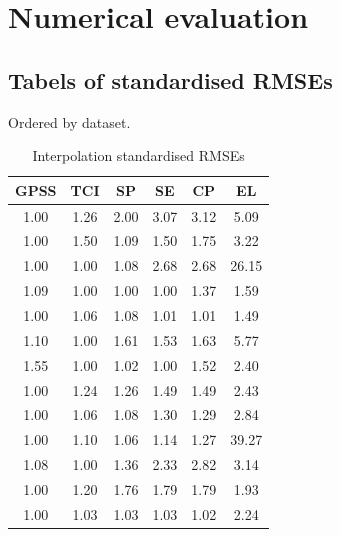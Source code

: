 \documentclass{article}
\begin{document}
\section{Numerical evaluation}

\subsection{Tabels of standardised RMSEs}

Ordered by dataset.

\begin{table}
\begin{tabular}{|c|c|c|c|c|c|}
\hline
GPSS & TCI & SP & SE & CP & EL \\
\hline
1.00 & 1.26 & 2.00 & 3.07 & 3.12 & 5.09\\
1.00 & 1.50 & 1.09 & 1.50 & 1.75 & 3.22\\
1.00 & 1.00 & 1.08 & 2.68 & 2.68 & 26.15\\
1.09 & 1.00 & 1.00 & 1.00 & 1.37 & 1.59\\
1.00 & 1.06 & 1.08 & 1.01 & 1.01 & 1.49\\
1.10 & 1.00 & 1.61 & 1.53 & 1.63 & 5.77\\
1.55 & 1.00 & 1.02 & 1.00 & 1.52 & 2.40\\
1.00 & 1.24 & 1.26 & 1.49 & 1.49 & 2.43\\
1.00 & 1.06 & 1.08 & 1.30 & 1.29 & 2.84\\
1.00 & 1.10 & 1.06 & 1.14 & 1.27 & 39.27\\
1.08 & 1.00 & 1.36 & 2.33 & 2.82 & 3.14\\
1.00 & 1.20 & 1.76 & 1.79 & 1.79 & 1.93\\
1.00 & 1.03 & 1.03 & 1.03 & 1.02 & 2.24\\
\hline
\end{tabular}
\caption{Interpolation standardised RMSEs}
\end{table}
\end{document}
